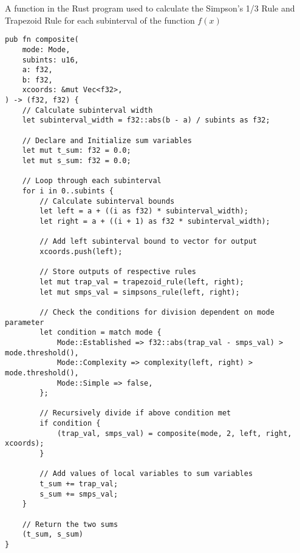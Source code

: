 \documentclass[../IA.tex]{subfiles}
\begin{document}
\begin{listing}[H]
\centering
{}
\caption{A function in the Rust program used to calculate the Simpson's 1/3 Rule and Trapezoid Rule for each subinterval of the function \(f(x)\)}
\label{lst:rust_composite}
\begin{verbatim}
pub fn composite(
    mode: Mode,
    subints: u16,
    a: f32,
    b: f32,
    xcoords: &mut Vec<f32>,
) -> (f32, f32) {
    // Calculate subinterval width
    let subinterval_width = f32::abs(b - a) / subints as f32;

    // Declare and Initialize sum variables
    let mut t_sum: f32 = 0.0;
    let mut s_sum: f32 = 0.0;

    // Loop through each subinterval
    for i in 0..subints {
        // Calculate subinterval bounds
        let left = a + ((i as f32) * subinterval_width);
        let right = a + ((i + 1) as f32 * subinterval_width);

        // Add left subinterval bound to vector for output
        xcoords.push(left);

        // Store outputs of respective rules
        let mut trap_val = trapezoid_rule(left, right);
        let mut smps_val = simpsons_rule(left, right);

        // Check the conditions for division dependent on mode parameter
        let condition = match mode {
            Mode::Established => f32::abs(trap_val - smps_val) > mode.threshold(),
            Mode::Complexity => complexity(left, right) > mode.threshold(),
            Mode::Simple => false,
        };

        // Recursively divide if above condition met
        if condition {
            (trap_val, smps_val) = composite(mode, 2, left, right, xcoords);
        }

        // Add values of local variables to sum variables
        t_sum += trap_val;
        s_sum += smps_val;
    }

    // Return the two sums
    (t_sum, s_sum)
}
\end{verbatim}
\end{listing}
\end{document}
